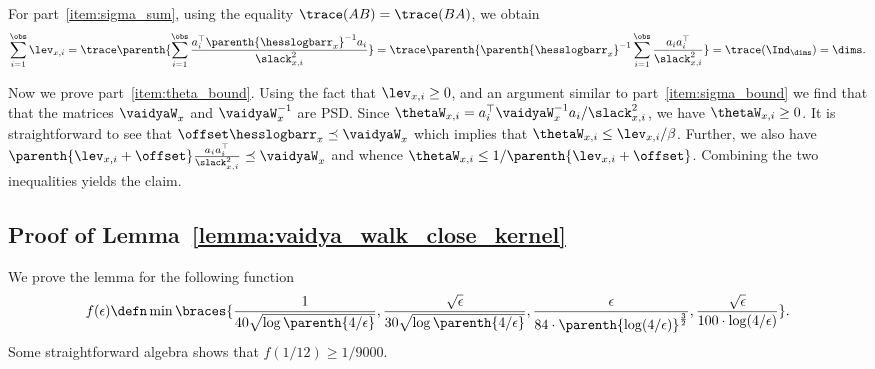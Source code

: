For part~\ref{item:sigma_sum}, using the equality $\trace(AB) = \trace(BA)$, we obtain
\begin{align*}
	\sum_{i=1}^\obs  \lev_{x, i}
	= \trace \parenth{\sum_{i=1}^\obs  \frac{a_i^\top \parenth{\hesslogbarr_x}^{-1} a_i}{\slack_{x, i}^2}}
	= \trace \parenth{\parenth{\hesslogbarr_x}^{-1}  \sum_{i=1}^\obs  \frac{a_i a_i^\top}{\slack_{x, i}^2}}
	= \trace (\Ind_\dims)
	= \dims.
\end{align*}

Now we prove part~\ref{item:theta_bound}.
Using the fact that $\lev_{x, i}\geq 0$, and an argument similar to part~\ref{item:sigma_bound} we find that that the matrices $\vaidyaW_x$ and $\vaidyaW_x^{-1}$ are PSD.
Since $\thetaW_{x, i} = {a_i^\top \vaidyaW_x^{-1} a_i}/{\slack_{x, i}^2}$, we have $\thetaW_{x,i}\geq 0$.
It is straightforward to see that $\offset\hesslogbarr_x \preceq \vaidyaW_x$ which implies that $\thetaW_{x, i} \leq \lev_{x, i}/\beta$.
Further, we also have $\parenth{\lev_{x, i}+ \offset}\frac{a_i a_i^\top}{\slack_{x, i}^2} \preceq \vaidyaW_x$ and whence $ \thetaW_{x, i} \leq 1/\parenth{\lev_{x, i}+ \offset} $.
Combining the two inequalities yields the claim.



\subsection{Proof of Lemma~\ref{lemma:vaidya_walk_close_kernel}} %
\label{ssub:proof_of_lemma_lemma:vaidya_walk_close_kernel}

We prove the lemma for the following function
\begin{subequations}
\begin{align}
	f(\epsilon) \defn 
	\min\braces{
	\frac{1}{40\sqrt{\log\parenth{4/\epsilon}}},
	\frac{\sqrt{\epsilon}}{30\sqrt{\log\parenth{4/\epsilon}}},
	\frac{\epsilon}{84 \cdot \parenth{\log(4/\epsilon)}^{\frac{3}{2}}}, 
	\frac{\sqrt{\epsilon}}{100 \cdot {\log(4/\epsilon)}} 
	}. 
	\label{eq:r_2_epsilon}
\end{align}
\end{subequations}
Some straightforward algebra shows that $f(1/12) \geq 1/9000$.



